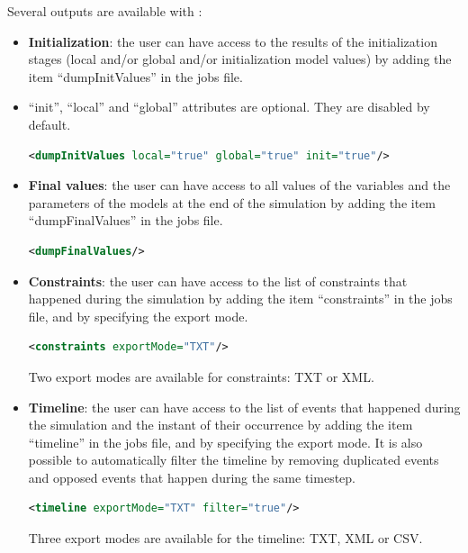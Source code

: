 \documentclass[a4paper, 12pt]{report}
\begin{document}
Several outputs are available with \Dynawo:
\begin{itemize}
\item \textbf{Initialization}: the user can have access to the results of the initialization stages (local and/or global and/or initialization model values) by adding the item ``dumpInitValues'' in the jobs file.
\item ``init'', ``local'' and ``global'' attributes are optional. They are disabled by default.

\begin{lstlisting}[language=XML, morekeywords={dumpInitValues},numbers=none]
<dumpInitValues local="true" global="true" init="true"/>
\end{lstlisting}

\item \textbf{Final values}: the user can have access to all values of the variables and the parameters of the models at the end of the simulation by adding the item ``dumpFinalValues'' in the jobs file.

\begin{lstlisting}[language=XML, morekeywords={dumpFinalValues},numbers=none]
<dumpFinalValues/>
\end{lstlisting}

\item \textbf{Constraints}: the user can have access to the list of constraints that happened during the simulation by adding the item ``constraints'' in the jobs file, and by specifying the export mode.
\begin{lstlisting}[language=XML, morekeywords={constraints},numbers=none]
<constraints exportMode="TXT"/>
\end{lstlisting}
Two export modes are available for constraints: TXT or XML.

\item \textbf{Timeline}: the user can have access to the list of events that happened during the simulation and the instant of their occurrence by adding the item ``timeline'' in the jobs file, and by specifying the export mode. It is also possible to automatically filter the timeline by removing duplicated events and opposed events that happen during the same timestep.

\begin{lstlisting}[language=XML, morekeywords={timeline},numbers=none]
<timeline exportMode="TXT" filter="true"/>
\end{lstlisting}
Three export modes are available for the timeline: TXT, XML or CSV.


\end{itemize}
\end{document}
